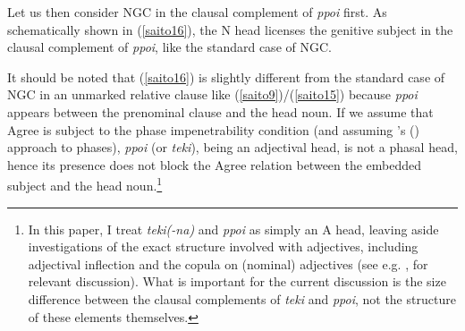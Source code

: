 \documentclass[output=paper]{langscibook}
\begin{document}
\begin{exe}
\ex \label{saito15}
\end{exe}

Let us then consider NGC in the clausal complement of \emph{ppoi} first. As schematically shown in (\ref{saito16}), the N head licenses the genitive subject in the clausal complement of \emph{ppoi}, like the standard case of NGC.

\begin{exe}
\ex \label{saito16}
\end{exe}

It should be noted that (\ref{saito16}) is slightly different from the standard case of NGC in an unmarked relative clause like (\ref{saito9})/(\ref{saito15}) because \emph{ppoi} appears between the prenominal clause and the head noun. If we assume that Agree is subject to the phase impenetrability condition (and assuming \citeauthor{Chomsky2000}'s (\citeyear{Chomsky2000,Chomsky2001}) approach to phases), \emph{ppoi} (or \emph{teki}), being an adjectival head, is not a phasal head, hence its presence does not block the Agree relation between the embedded subject and the head noun.\footnote{In this paper, I treat \emph{teki(-na)} and \emph{ppoi} as simply an A head, leaving aside investigations of the exact structure involved with adjectives, including adjectival inflection and the copula on (nominal) adjectives (see e.g. \citealt{nishiyama1999}, \citealt{Yamakido2005,Yamakido2013} for relevant discussion). What is important for the current discussion is the size difference between the clausal complements of \emph{teki} and \emph{ppoi}, not the structure of these elements themselves.}
\end{document}
